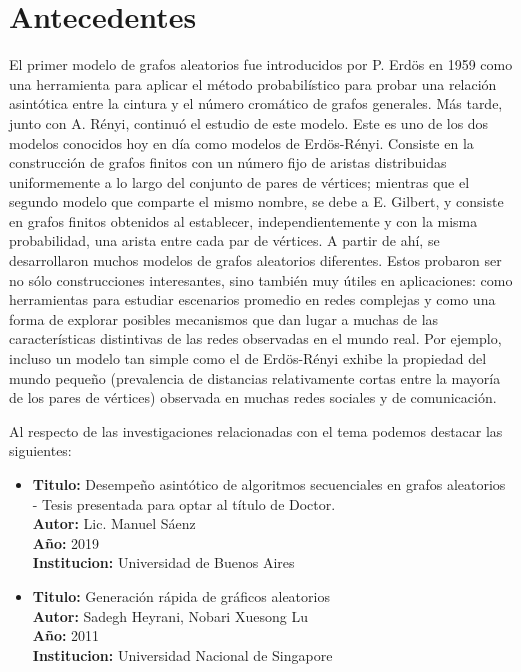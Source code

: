 \documentclass[11pt]{extarticle}
\begin{document}
\section{Antecedentes}
El primer modelo de grafos aleatorios fue introducidos por P. Erdös en 1959 como una
herramienta para aplicar el método probabilístico para probar una relación asintótica entre
la cintura y el número cromático de grafos generales. Más tarde, junto con A. Rényi,
continuó el estudio de este modelo. Este es uno de los dos modelos conocidos
hoy en día como modelos de Erdös-Rényi. Consiste en la construcción de grafos finitos con un
número fijo de aristas distribuidas uniformemente a lo largo del conjunto de pares de vértices;
mientras que el segundo modelo que comparte el mismo nombre, se debe a E. Gilbert, y
consiste en grafos finitos obtenidos al establecer, independientemente y con la misma probabilidad, una arista entre cada par de vértices. A partir de ahí, se desarrollaron muchos modelos
de grafos aleatorios diferentes. Estos probaron ser no sólo construcciones interesantes, sino
también muy útiles en aplicaciones: como herramientas para estudiar escenarios promedio en
redes complejas y como una forma de explorar posibles mecanismos que dan lugar a muchas
de las características distintivas de las redes observadas en el mundo real. Por ejemplo, incluso
un modelo tan simple como el de Erdös-Rényi exhibe la propiedad del mundo pequeño (prevalencia de distancias relativamente cortas entre la mayoría de los pares de vértices) observada
en muchas redes sociales y de comunicación.

Al respecto de las investigaciones relacionadas con el tema podemos destacar las siguientes:

\begin{itemize}
  \item \textbf{Titulo:} Desempeño asintótico de algoritmos secuenciales
  en grafos aleatorios - Tesis presentada para optar al título de Doctor.\\
  \textbf{Autor:} Lic. Manuel Sáenz \\
  \textbf{A\~no:} 2019\\
  \textbf{Institucion:} Universidad de Buenos Aires\\
\end{itemize}

\begin{itemize}
  \item \textbf{Titulo:} Generación rápida de gráficos aleatorios\\
  \textbf{Autor:} Sadegh Heyrani, Nobari Xuesong Lu \\
  \textbf{A\~no:} 2011\\
  \textbf{Institucion:} Universidad Nacional de Singapore\\
\end{itemize}
\end{document}
